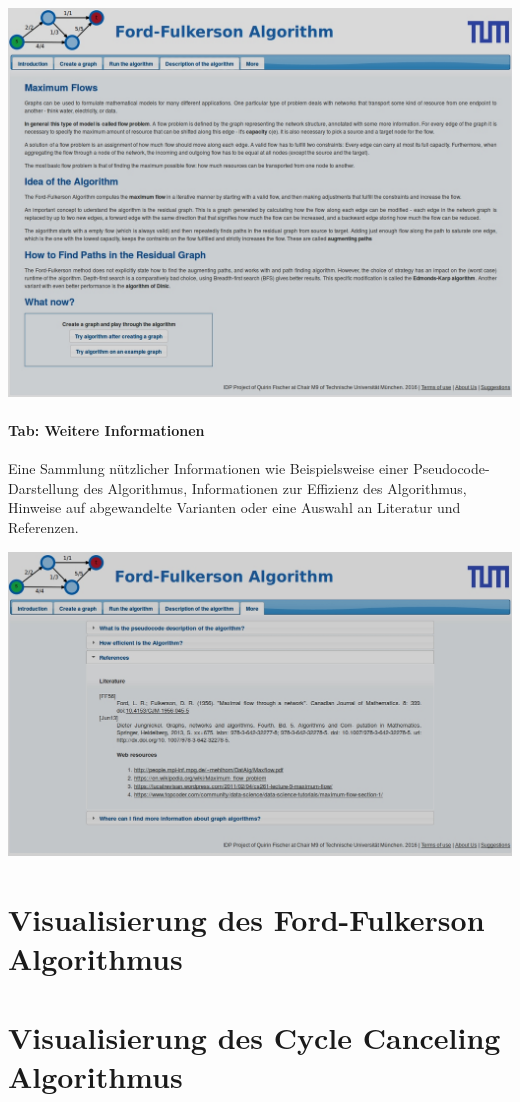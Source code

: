 \begin{center}
\begin{minipage}[t]{0.60\textwidth}
    \includegraphics[width=\textwidth]{img/layout-4.jpg}
\end{minipage}
\end{center}
\vspace{1cm}

\paragraph{Tab: Weitere Informationen}

Eine Sammlung nützlicher Informationen wie Beispielsweise einer Pseudocode-Darstellung des Algorithmus, Informationen zur Effizienz des Algorithmus, Hinweise auf abgewandelte Varianten oder eine Auswahl an Literatur und Referenzen.

\begin{center}
\begin{minipage}[t]{0.60\textwidth}
    \includegraphics[width=\textwidth]{img/layout-5.jpg}
\end{minipage}
\end{center}

\section{Visualisierung des Ford-Fulkerson Algorithmus}
\section{Visualisierung des Cycle Canceling Algorithmus}
